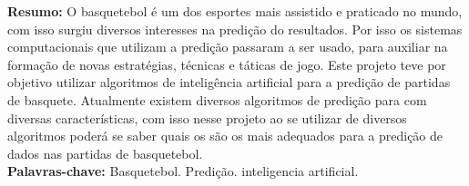 \begin{singlespace}
\textbf{Resumo:}
O basquetebol é um dos esportes mais assistido e praticado no mundo, com isso surgiu diversos interesses na predição do resultados. Por isso os sistemas computacionais que utilizam a predição passaram a ser usado, para auxiliar na formação de novas estratégias, técnicas e táticas de jogo. Este projeto teve por objetivo utilizar algoritmos de inteligência artificial para a predição de partidas de basquete. Atualmente existem diversos algoritmos de predição para com diversas características, com isso nesse projeto ao se utilizar de diversos algoritmos poderá se saber quais os são os mais adequados para a predição de dados nas partidas de basquetebol.\\
\textbf{Palavras-chave: }
Basquetebol. Predição. inteligencia artificial.
\end{singlespace}
